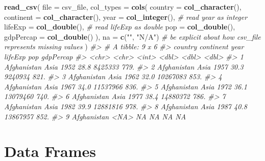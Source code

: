 \documentclass[
]{report}
\newenvironment{Shaded}{\begin{snugshade}}{\end{snugshade}}
\newcommand{\CommentTok}[1]{\textcolor[rgb]{0.56,0.35,0.01}{\textit{#1}}}
\newcommand{\DataTypeTok}[1]{\textcolor[rgb]{0.13,0.29,0.53}{#1}}
\newcommand{\KeywordTok}[1]{\textcolor[rgb]{0.13,0.29,0.53}{\textbf{#1}}}
\newcommand{\NormalTok}[1]{#1}
\newcommand{\StringTok}[1]{\textcolor[rgb]{0.31,0.60,0.02}{#1}}
\begin{document}
\begin{Shaded}
\begin{Highlighting}[]
\KeywordTok{read\_csv}\NormalTok{(}
  \DataTypeTok{file =}\NormalTok{ csv\_file,}
  \DataTypeTok{col\_types =} \KeywordTok{cols}\NormalTok{(}
    \DataTypeTok{country =} \KeywordTok{col\_character}\NormalTok{(),}
    \DataTypeTok{continent =} \KeywordTok{col\_character}\NormalTok{(),}
    \DataTypeTok{year =} \KeywordTok{col\_integer}\NormalTok{(),        }\CommentTok{\# read \textasciigrave{}year\textasciigrave{} as \textasciigrave{}integer\textasciigrave{}}
    \DataTypeTok{lifeExp =} \KeywordTok{col\_double}\NormalTok{(),      }\CommentTok{\# read \textasciigrave{}lifeExp\textasciigrave{} as \textasciigrave{}double\textasciigrave{}}
    \DataTypeTok{pop =} \KeywordTok{col\_double}\NormalTok{(),}
    \DataTypeTok{gdpPercap =} \KeywordTok{col\_double}\NormalTok{()}
\NormalTok{  ),}
  \DataTypeTok{na =} \KeywordTok{c}\NormalTok{(}\StringTok{""}\NormalTok{, }\StringTok{"N/A"}\NormalTok{)              }\CommentTok{\# be explicit about how \textasciigrave{}csv\_file\textasciigrave{} represents missing values}
\NormalTok{)}
\CommentTok{\#\textgreater{} \# A tibble: 9 x 6}
\CommentTok{\#\textgreater{}   country     continent  year lifeExp      pop gdpPercap}
\CommentTok{\#\textgreater{}   \textless{}chr\textgreater{}       \textless{}chr\textgreater{}     \textless{}int\textgreater{}   \textless{}dbl\textgreater{}    \textless{}dbl\textgreater{}     \textless{}dbl\textgreater{}}
\CommentTok{\#\textgreater{} 1 Afghanistan Asia       1952    28.8  8425333      779.}
\CommentTok{\#\textgreater{} 2 Afghanistan Asia       1957    30.3  9240934      821.}
\CommentTok{\#\textgreater{} 3 Afghanistan Asia       1962    32.0 10267083      853.}
\CommentTok{\#\textgreater{} 4 Afghanistan Asia       1967    34.0 11537966      836.}
\CommentTok{\#\textgreater{} 5 Afghanistan Asia       1972    36.1 13079460      740.}
\CommentTok{\#\textgreater{} 6 Afghanistan Asia       1977    38.4 14880372      786.}
\CommentTok{\#\textgreater{} 7 Afghanistan Asia       1982    39.9 12881816      978.}
\CommentTok{\#\textgreater{} 8 Afghanistan Asia       1987    40.8 13867957      852.}
\CommentTok{\#\textgreater{} 9 Afghanistan \textless{}NA\textgreater{}         NA    NA         NA       NA}
\end{Highlighting}
\end{Shaded}

\cleardoublepage

\hypertarget{part-data-frames}{%
\part{Data Frames}\label{part-data-frames}}
\end{document}
